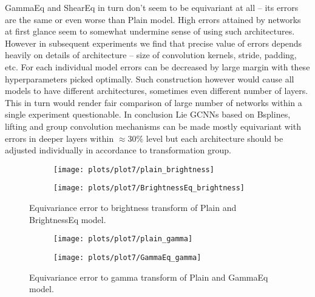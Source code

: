     GammaEq and ShearEq in turn don't seem to be equivariant
    at all -- its errors are the same or even worse
    than Plain model. High errors attained by networks at first glance seem to
    somewhat undermine sense of using such architectures.
    However
    in subsequent experiments we find that precise value of errors
    depends heavily on details of architecture -- size of convolution
    kernels, stride, padding, etc. For each individual model errors can
    be decreased by large margin with these hyperparameters picked
    optimally. Such construction however would cause all models to have different
    architectures, sometimes even different number of layers.
    This in
    turn would render fair comparison of large number of networks within
    a single experiment questionable.
    In conclusion Lie GCNNs based on Bsplines, lifting and group
    convolution mechanisms
    can be made mostly equivariant with errors in deeper layers within $\approx
    30\%$ level but each architecture should be adjusted individually in
    accordance to transformation group.


    \begin{figure}[h!]
    \begin{adjustwidth}{-11em}{-11em}
        \centering
        \begin{subfigure}{0.4\textwidth}
            \texttt{[image: plots/plot7/plain\_brightness]}
        \end{subfigure}
        \begin{subfigure}{0.4\textwidth}
            \texttt{[image: plots/plot7/BrightnessEq\_brightness]}
        \end{subfigure}
    \end{adjustwidth}
        \caption{Equivariance error to brightness transform of Plain and BrightnessEq
        model.}
        \label{fig:plot7brightness}
    \end{figure}

    \begin{figure}[h!]
    \begin{adjustwidth}{-11em}{-11em}
        \centering
        \begin{subfigure}{0.4\textwidth}
            \texttt{[image: plots/plot7/plain\_gamma]}
        \end{subfigure}
        \begin{subfigure}{0.4\textwidth}
            \texttt{[image: plots/plot7/GammaEq\_gamma]}
        \end{subfigure}
    \end{adjustwidth}
        \caption{Equivariance error to gamma transform of Plain and GammaEq
        model.}
        \label{fig:plot7gamma}
    \end{figure}

